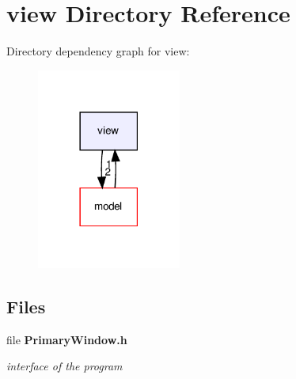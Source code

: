 \section{view Directory Reference}
\label{dir_b2f003339c516cc00c8cadcafbe82f13}
Directory dependency graph for view\+:
\nopagebreak
\begin{figure}[H]
\begin{center}
\leavevmode
\includegraphics[width=134pt]{dir_b2f003339c516cc00c8cadcafbe82f13_dep}
\end{center}
\end{figure}
\subsection*{Files}
\begin{DoxyCompactItemize}
\item 
file \textbf{ Primary\+Window.\+h}
\begin{DoxyCompactList}\small\item\em interface of the program \end{DoxyCompactList}\end{DoxyCompactItemize}
